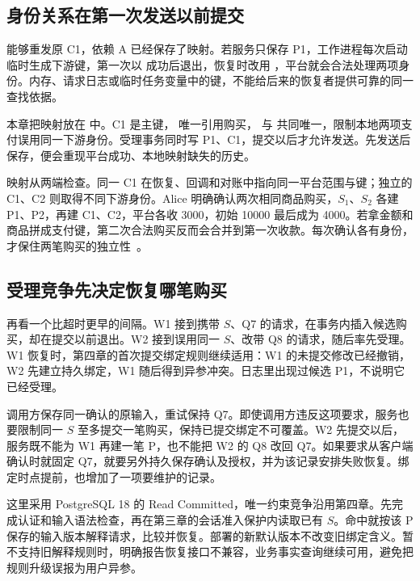 \subsection*{身份关系在第一次发送以前提交}

能够重发原 C1，依赖 A 已经保存了映射。若服务只保存 P1，工作进程每次启动临时生成下游键，第一次以  成功后退出，恢复时改用 ，平台就会合法处理两项身份。内存、请求日志或临时任务变量中的键，不能给后来的恢复者提供可靠的同一查找依据。

本章把映射放在  中。C1 是主键， 唯一引用购买， 与  共同唯一，限制本地两项支付误用同一下游身份。受理事务同时写 P1、C1，提交以后才允许发送。先发送后保存，便会重现平台成功、本地映射缺失的历史。


映射从两端检查。同一 C1 在恢复、回调和对账中指向同一平台范围与键；独立的 C1、C2 则取得不同下游身份。Alice 明确确认两次相同商品购买，\(S_1\)、\(S_2\) 各建 P1、P2，再建 C1、C2，平台各收 3000，初始 10000 最后成为 4000。若拿金额和商品拼成支付键，第二次合法购买反而会合并到第一次收款。每次确认各有身份，才保住两笔购买的独立性~\cite{aws-idempotent}。

\subsection*{受理竞争先决定恢复哪笔购买}

再看一个比超时更早的间隔。W1 接到携带 \(S\)、Q7 的请求，在事务内插入候选购买，却在提交以前退出。W2 接到误用同一 \(S\)、改带 Q8 的请求，随后率先受理。W1 恢复时，第四章的首次提交绑定规则继续适用：W1 的未提交修改已经撤销，W2 先建立持久绑定，W1 随后得到异参冲突。日志里出现过候选 P1，不说明它已经受理。

调用方保存同一确认的原输入，重试保持 Q7。即使调用方违反这项要求，服务也要限制同一 \(S\) 至多提交一笔购买，保持已提交绑定不可覆盖。W2 先提交以后，服务既不能为 W1 再建一笔 P，也不能把 W2 的 Q8 改回 Q7。如果要求从客户端确认时就固定 Q7，就要另外持久保存确认及授权，并为该记录安排失败恢复。绑定时点提前，也增加了一项要维护的记录。

这里采用 PostgreSQL 18 的 Read Committed，唯一约束竞争沿用第四章。先完成认证和输入语法检查，再在第三章的会话准入保护内读取已有 \(S\)。命中就按该 P 保存的输入版本解释请求，比较并恢复。部署的新默认版本不改变旧绑定含义。暂不支持旧解释规则时，明确报告恢复接口不兼容，业务事实查询继续可用，避免把规则升级误报为用户异参。


